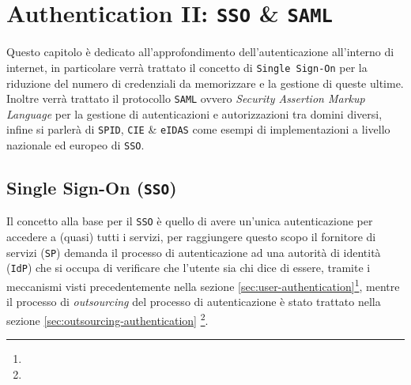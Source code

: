\chapter{Authentication II: \texttt{SSO} \& \texttt{SAML}}
\label{chap:authentication-ii}
\thispagestyle{chapterInit}
Questo capitolo è dedicato all'approfondimento dell'autenticazione all'interno di internet, in particolare verrà trattato il concetto di \texttt{Single Sign-On} per la riduzione del numero di credenziali da memorizzare e la gestione di queste ultime. Inoltre verrà trattato il protocollo \texttt{SAML} ovvero \textit{Security Assertion Markup Language} per la gestione di autenticazioni e autorizzazioni tra domini diversi, infine si parlerà di \texttt{SPID}, \texttt{CIE} \& \texttt{eIDAS} come esempi di implementazioni a livello nazionale ed europeo di \texttt{SSO}.
\section{Single Sign-On (\texttt{SSO})}
    \label{sec:sso}
    Il concetto alla base per il \texttt{SSO} è quello di avere un'unica autenticazione per accedere a (quasi) tutti i servizi, per raggiungere questo scopo il fornitore di servizi (\texttt{SP}) demanda il processo di autenticazione ad una autorità di identità (\texttt{IdP}) che si occupa di verificare che l'utente sia chi dice di essere, tramite i meccanismi visti precedentemente nella sezione \ref{sec:user-authentication}\footnote{}, mentre il processo di \textit{outsourcing} del processo di autenticazione è stato trattato nella sezione \ref{sec:outsourcing-authentication} \footnote{}.
